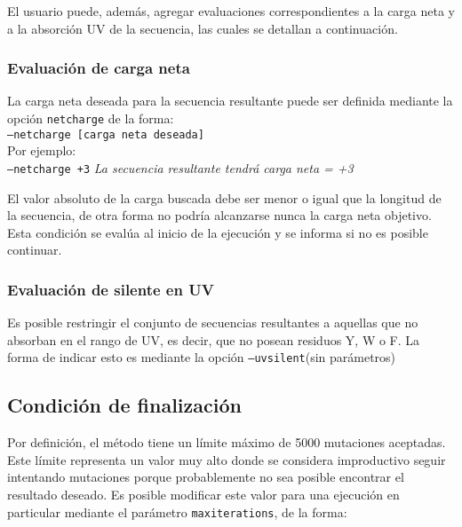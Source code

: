

El usuario puede, además, agregar evaluaciones correspondientes a la carga neta y a la absorción UV de la secuencia, las cuales se detallan a continuación.

\subsubsection{Evaluación de carga neta}

La carga neta deseada para la secuencia resultante puede ser definida mediante la opción \texttt{netcharge} de la forma: \\
\indent \texttt{--netcharge [carga neta deseada]} 
\\Por ejemplo: \\
\indent \texttt{--netcharge +3} \hspace{0.5cm} \textit{La secuencia resultante tendrá carga neta = +3}

El valor absoluto de la carga buscada debe ser menor o igual que la longitud de la secuencia, de otra forma no podría alcanzarse nunca la carga neta objetivo.
Esta condición se evalúa al inicio de la ejecución y se informa si no es posible continuar.


\subsubsection{Evaluación de silente en UV}\label{uvsilent}

Es posible restringir el conjunto de secuencias resultantes a aquellas que no absorban en el rango de UV, es decir, que no posean residuos Y, W o F.
La forma de indicar esto es mediante la opción \texttt{--uvsilent}(sin parámetros)



\subsection{Condición de finalización} \label{condicionFin}

Por definición, el método tiene un límite máximo de 5000 mutaciones aceptadas.
Este límite representa un valor muy alto donde se considera improductivo seguir intentando mutaciones porque probablemente no sea posible encontrar el resultado deseado.
Es posible modificar este valor para una ejecución en particular mediante el parámetro \texttt{maxiterations}, de la forma:

